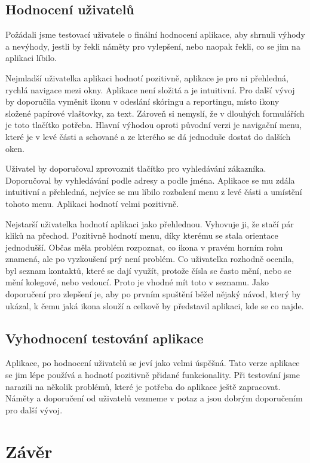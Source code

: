 \documentclass[11pt,twoside,a4paper]{book}
\begin{document}
\section{Hodnocení uživatelů}
Požádali jsme testovací uživatele o finální hodnocení aplikace, aby shrnuli výhody a nevýhody, jestli by řekli náměty pro vylepšení, nebo naopak řekli, co se jim na aplikaci líbilo.

Nejmladší uživatelka aplikaci hodnotí pozitivně, aplikace je pro ni přehledná, rychlá navigace mezi okny. Aplikace není složitá a je intuitivní. Pro další vývoj by doporučila vyměnit ikonu v odeslání skóringu a reportingu, místo ikony složené papírové vlaštovky, za text. Zároveň si nemyslí, že v dlouhých formulářích je toto tlačítko potřeba. Hlavní výhodou oproti původní verzi je navigační menu, které je v levé části a schované a ze kterého se dá jednoduše dostat do dalších oken.

Uživatel by doporučoval zprovoznit tlačítko pro vyhledávání zákazníka. Doporučoval by vyhledávání podle adresy a podle jména. Aplikace se mu zdála intuitivní a přehledná, nejvíce se mu líbilo rozbalení menu z levé části a umístění tohoto menu. Aplikaci hodnotí velmi pozitivně.

Nejstarší uživatelka hodnotí aplikaci jako přehlednou. Vyhovuje ji, že stačí pár kliků na přechod. Pozitivně hodnotí menu, díky kterému se stala orientace jednodušší. Občas měla problém rozpoznat, co ikona v pravém horním rohu znamená, ale po vyzkoušení prý není problém.  Co uživatelka rozhodně ocenila, byl seznam kontaktů, které se dají využít, protože čísla se často mění, nebo se mění kolegové, nebo vedoucí. Proto je vhodné mít toto v seznamu. Jako doporučení pro zlepšení je, aby po prvním spuštění běžel nějaký návod, který by ukázal, k čemu jaká ikona slouží a celkově by představil aplikaci, kde se co najde.

\section{Vyhodnocení testování aplikace}
Aplikace, po hodnocení uživatelů se jeví jako velmi úspěšná. Tato verze aplikace se jim lépe používá a hodnotí pozitivně přidané funkcionality. Při testování jsme narazili na několik problémů, které je potřeba do aplikace ještě zapracovat. Náměty a doporučení od uživatelů vezmeme v potaz a jsou dobrým doporučením pro další vývoj. 


\chapter{Závěr}
\end{document}
